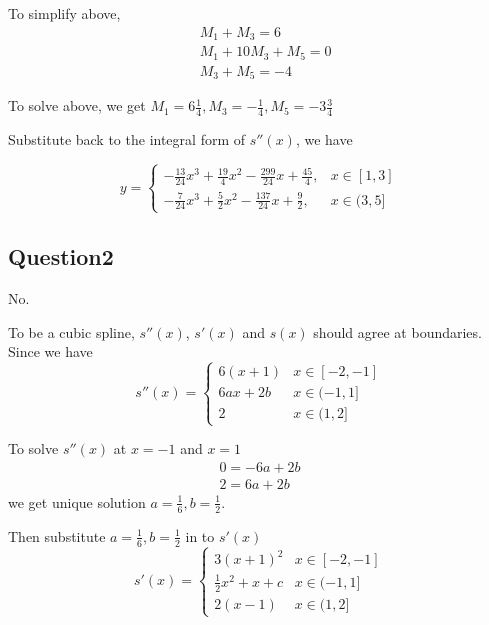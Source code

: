\documentclass{article}
\begin{document}
To simplify above,
\begin{equation}
  \begin{split}
    & M_1 + M_3 = 6\\
    & M_1+  10 M_3 + M_5 = 0\\
    & M_3 + M_5 = -4
  \end{split}
\end{equation}

To solve above, we get $ M_1 = 6 \frac{1}{4} ,   M_3 = -\frac{1}{4} , M_5 = - 3 \frac{3}{4} $

Substitute back to the integral form of $ s''(x)$, we have

\begin{equation} y =
  \begin{cases}
    -\frac{13}{24} x^3 +\frac{19 }{4} x^2- \frac{299 }{24} x+ \frac{45}{4}, & x \in [1,3]\\
    -\frac{7}{24} x^3 +\frac{5}{2} x^2- \frac{137}{24} x+ \frac{9}{2}, & x \in (3,5]
  \end{cases}
\end{equation}


\subsection*{Question2}
No.

To be a cubic spline, $ s''(x) $, $ s'(x) $ and $ s(x)$ should agree at boundaries.
Since we have
\begin{equation} s''(x) =
  \begin{cases}
    6(x+1) & x \in [-2,-1]\\
    6ax + 2b & x \in (-1, 1]\\
    2 & x \in (1,2]
  \end{cases}
\end{equation}

To solve $s''(x)$ at $x = -1$ and $x = 1$
\begin{equation}
  \begin{split}
    0 = -6a + 2b \\
    2 = 6a + 2b
  \end{split}
\end{equation}
we get unique solution $ a = \frac{1}{6}, b = \frac{1}{2}$.

Then substitute $a= \frac{1}{6}, b = \frac{1}{2}$ in to $s'(x)$
\begin{equation} s'(x) =
  \begin{cases}
    3(x+1)^2 & x \in [-2,-1]\\
    \frac{1}{2}x^2 + x + c & x \in (-1, 1]\\
    2(x-1) & x \in (1,2]
  \end{cases}
\end{equation}
\end{document}
